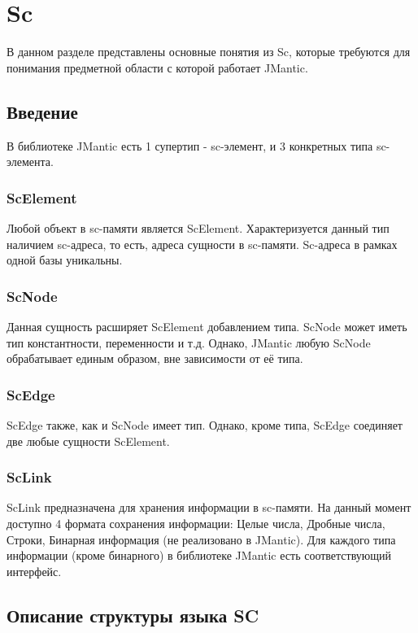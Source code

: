 \section{Sc}
В данном разделе представлены основные понятия из Sc, которые требуются для понимания предметной области с которой работает JMantic. 

\subsection{Введение}

В библиотеке JMantic есть 1 супертип - sc-элемент, и 3 конкретных типа sc-элемента. 

\subsubsection{ScElement}
Любой объект в sc-памяти является ScElement. Характеризуется данный тип наличием sc-адреса, то есть, адреса сущности в sc-памяти. Sc-адреса в рамках одной базы уникальны.

\subsubsection{ScNode}
Данная сущность расширяет ScElement добавлением типа. ScNode может иметь тип константности, переменности и т.д. Однако, JMantic любую ScNode обрабатывает единым образом, вне зависимости от её типа. 

\subsubsection{ScEdge}
ScEdge также, как и ScNode имеет тип. Однако, кроме типа, ScEdge соединяет две любые сущности ScElement.

\subsubsection{ScLink}
ScLink предназначена для хранения информации в sc-памяти. На данный момент доступно 4 формата сохранения информации: Целые числа, Дробные числа, Строки, Бинарная информация (не реализовано в JMantic). 
Для каждого типа информации (кроме бинарного) в библиотеке JMantic есть соответствующий интерфейс. 

\subsection{Описание структуры языка SC}

